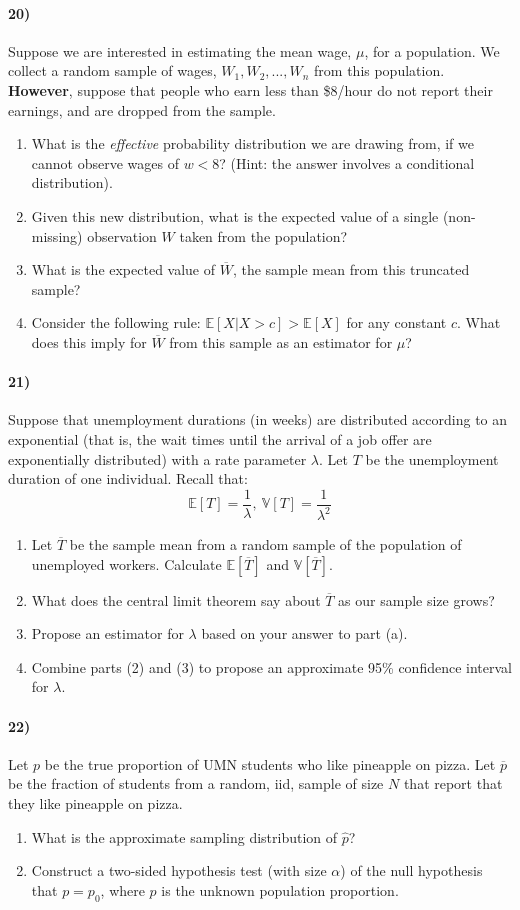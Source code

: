 \documentclass[12pt]{article}
\newcommand\ov{\overline}
\newcommand\BB{\mathbb}
\newcommand\EE{\mathbb{E}}
\newcommand\h{\hat}
\numberwithin{equation}{section}
\numberwithin{figure}{section}
\numberwithin{table}{section}
\begin{document}
\paragraph{20)} Suppose we are interested in estimating the mean wage, $\mu$, for a population. We collect a random sample of wages, $W_1,W_2,...,W_n$ from this population. \textbf{However}, suppose that people who earn less than \$8/hour do not report their earnings, and are dropped from the sample.
\begin{enumerate}
\item What is the \emph{effective} probability distribution we are drawing from, if we cannot observe wages of $w<8$? (Hint: the answer involves a conditional distribution).
\item Given this new distribution, what is the expected value of a single (non-missing) observation $W$ taken from the population?
\item What is the expected value of $\ov{W}$, the sample mean from this truncated sample?
\item Consider the following rule: $\EE[X|X>c]>\EE[X]$ for any constant $c$. What does this imply for $\ov{W}$ from this sample as an estimator for $\mu$?
\end{enumerate}

\paragraph{21)} Suppose that unemployment durations (in weeks) are distributed according to an exponential (that is, the wait times until the arrival of a job offer are exponentially distributed) with a rate parameter $\lambda$. Let $T$ be the unemployment duration of one individual. Recall that:
\[\EE[T] = \frac{1}{\lambda},\ \BB{V}[T]=\frac{1}{\lambda^2}\]
\begin{enumerate}
\item Let $\ov{T}$ be the sample mean from a random sample of the population of unemployed workers. Calculate $\EE[\ov{T}]$ and $\BB{V}[\ov{T}]$.
\item What does the central limit theorem say about $\ov{T}$ as our sample size grows?
\item Propose an estimator for $\lambda$ based on your answer to part (a).
\item Combine parts (2) and (3) to propose an approximate 95\% confidence interval for $\lambda$.
\end{enumerate}

\paragraph{22)} Let $p$ be the true proportion of UMN students who like pineapple on pizza. Let $\ov{p}$ be the fraction of students from a random, iid, sample of size $N$ that report that they like pineapple on pizza.
\begin{enumerate}
\item What is the approximate sampling distribution of $\h{p}$?
\item Construct a two-sided hypothesis test (with size $\alpha$) of the null hypothesis that $p=p_0$, where $p$ is the unknown population proportion.
\end{enumerate}
\end{document}
